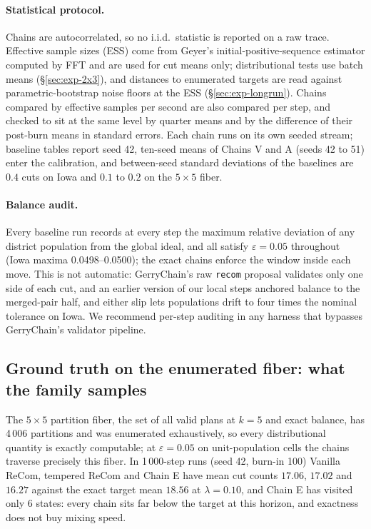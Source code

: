 \documentclass[11pt]{article}
\begin{document}
\paragraph{Statistical protocol.} Chains are autocorrelated, so no
i.i.d.\ statistic is reported on a raw trace. Effective sample sizes
(ESS) come from Geyer's initial-positive-sequence estimator computed
by FFT and are used for cut means only; distributional tests use batch
means (\S\ref{sec:exp-2x3}), and distances to enumerated targets are
read against parametric-bootstrap noise floors at the ESS
(\S\ref{sec:exp-longrun}). Chains compared by effective samples per
second are also compared per step, and checked to sit at the same
level by quarter means and by the difference of their post-burn means
in standard errors. Each chain runs on its own seeded stream; baseline
tables report seed 42, ten-seed means of Chains V and A (seeds 42 to
51) enter the calibration, and between-seed standard deviations of
the baselines are $0.4$ cuts on Iowa and $0.1$ to $0.2$ on the
$5 \times 5$ fiber.

\paragraph{Balance audit.}\label{sec:exp-balance} Every baseline run
records at every step the maximum relative deviation of any district
population from the global ideal, and all satisfy
$\varepsilon = 0.05$ throughout (Iowa maxima 0.0498--0.0500); the
exact chains enforce the window inside each move. This is not
automatic: GerryChain's raw \texttt{recom} proposal validates only one
side of each cut, and an earlier version of our local steps anchored
balance to the merged-pair half, and either slip lets populations
drift to four times the nominal tolerance on Iowa. We recommend
per-step auditing in any harness that bypasses GerryChain's validator
pipeline.

\subsection{Ground truth on the enumerated fiber: what the family samples}\label{sec:exp-5x5}

The $5 \times 5$ partition fiber, the set of all valid plans at
$k = 5$ and exact balance, has 4\,006 partitions and was enumerated
exhaustively, so every distributional quantity is exactly computable;
at $\varepsilon = 0.05$ on unit-population cells the chains traverse
precisely this fiber. In 1\,000-step runs (seed 42, burn-in 100)
Vanilla ReCom, tempered ReCom and Chain E have mean cut counts
$17.06$, $17.02$ and $16.27$ against the exact target mean $18.56$ at
$\lambda = 0.10$, and Chain E has visited only 6 states: every chain
sits far below the target at this horizon, and exactness does not buy
mixing speed.
\end{document}
